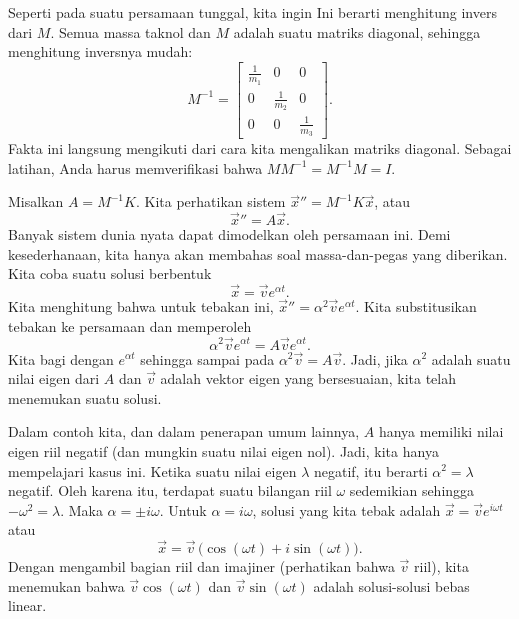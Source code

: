 Seperti pada suatu persamaan tunggal, kita ingin   Ini berarti
menghitung invers dari $M$.
Semua massa taknol dan $M$ adalah suatu
matriks diagonal, sehingga menghitung inversnya
mudah:
\begin{equation*}
M^{-1} =
\begin{bmatrix}
\frac{1}{m_1} & 0 & 0 \\
0 & \frac{1}{m_2} & 0 \\
0 & 0 & \frac{1}{m_3}
\end{bmatrix} .
\end{equation*}
Fakta ini langsung mengikuti
dari cara kita mengalikan matriks diagonal.  Sebagai latihan, Anda harus memverifikasi bahwa
$M M^{-1} = M^{-1} M = I$.

\medskip

Misalkan $A = M^{-1}K$.  Kita perhatikan sistem
${\vec{x}}'' = M^{-1}K \vec{x}$, atau
\begin{equation*}
{\vec{x}}'' = A \vec{x} .
\end{equation*}
Banyak sistem dunia nyata dapat dimodelkan oleh persamaan ini.  Demi kesederhanaan,
kita hanya akan membahas
soal massa-dan-pegas yang diberikan.  Kita coba suatu solusi berbentuk
\begin{equation*}
\vec{x} = \vec{v} e^{\alpha t} .
\end{equation*}
Kita menghitung bahwa untuk tebakan ini,
${\vec{x}}'' = \alpha^2 \vec{v} e^{\alpha t}$.
Kita substitusikan tebakan ke persamaan dan memperoleh
\begin{equation*}
\alpha^2 \vec{v} e^{\alpha t} = A\vec{v} e^{\alpha t} .
\end{equation*}
Kita bagi dengan $e^{\alpha t}$ sehingga sampai pada
$\alpha^2 \vec{v} = A\vec{v}$.  Jadi, jika $\alpha^2$ adalah suatu nilai eigen
dari $A$ dan $\vec{v}$ adalah vektor eigen yang bersesuaian, kita telah menemukan
suatu solusi.

Dalam contoh kita, dan dalam penerapan umum lainnya,
$A$ hanya memiliki nilai eigen riil negatif
(dan mungkin suatu nilai eigen nol).  Jadi, kita hanya mempelajari
kasus ini.  Ketika suatu nilai eigen $\lambda$ negatif, itu berarti
$\alpha^2 = \lambda$ negatif.  Oleh karena itu, terdapat suatu bilangan riil $\omega$
sedemikian sehingga $-\omega^2 = \lambda$.  Maka $\alpha = \pm i \omega$.
Untuk $\alpha = i \omega$, solusi yang kita tebak adalah $\vec{x} = \vec{v} e^{i \omega t}$ atau
\begin{equation*}
\vec{x} = \vec{v} \, \bigl(\cos (\omega t) + i \sin (\omega t) \bigr) .
\end{equation*}
Dengan mengambil bagian riil dan imajiner (perhatikan bahwa $\vec{v}$ riil), kita
menemukan bahwa 
$\vec{v} \cos (\omega t)$ dan
$\vec{v} \sin (\omega t)$ adalah solusi-solusi bebas linear.

